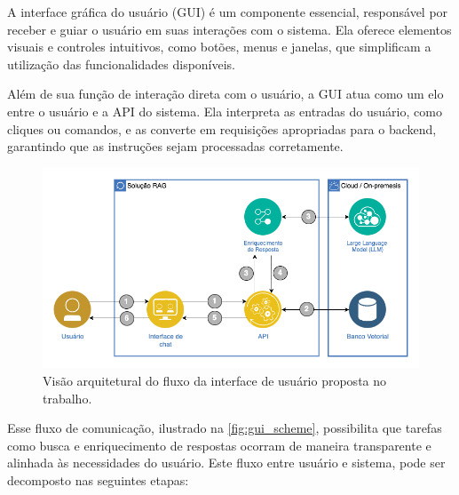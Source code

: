 \documentclass[a4paper, 12pt]{article}
\begin{document}
    A interface gráfica do usuário (GUI) é um componente essencial, responsável por receber e guiar o usuário em suas interações com o sistema. Ela oferece elementos visuais e controles intuitivos, como botões, menus e janelas, que simplificam a utilização das funcionalidades disponíveis.

    Além de sua função de interação direta com o usuário, a GUI atua como um elo entre o usuário e a API do sistema. Ela interpreta as entradas do usuário, como cliques ou comandos, e as converte em requisições apropriadas para o backend, garantindo que as instruções sejam processadas corretamente.

    \begin{figure}
        \includegraphics[width=\textwidth,height=0.9\textheight,keepaspectratio]{architecture-solution.png}
        \centering
        \caption{Visão arquitetural do fluxo da interface de usuário proposta no trabalho.}
        \centering
        \label{fig:gui_scheme}
    \end{figure}

    Esse fluxo de comunicação, ilustrado na \autoref{fig:gui_scheme}, possibilita que tarefas como busca e enriquecimento de respostas ocorram de maneira transparente e alinhada às necessidades do usuário. Este fluxo entre usuário e sistema, pode ser decomposto nas seguintes etapas:
\end{document}
